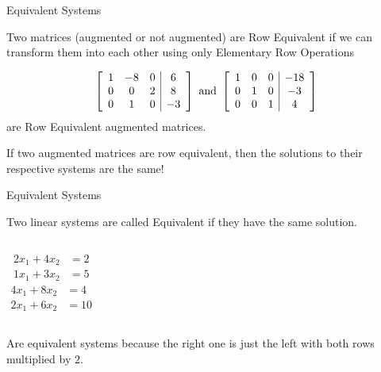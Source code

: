 \documentclass[xcoler=dvipsnames, aspectratio=169]{beamer}
\begin{document}
\begin{frame}{Equivalent Systems}
    \begin{defn}
        Two matrices (augmented or not augmented) are Row Equivalent if we can transform them into
        each other using only Elementary Row Operations
    \end{defn}
    \pause
    \begin{example}
        \[
            \aMat{ccc|c}{
                1 & -8 & 0 & 6\\
                0 &  0 & 2 & 8\\
                0 &  1 & 0 &-3
            }\text{ and }\aMat{ccc|c}{
                1 &  0 & 0 &-18\\
                0 &  1 & 0 &-3\\
                0 &  0 & 1 & 4
            }
        \]
        are Row Equivalent augmented matrices.
    \end{example}
    \pause
    \begin{rem}
        If two augmented matrices are row equivalent, then the solutions to their respective 
        systems are the same!
    \end{rem}
\end{frame}
\begin{frame}{Equivalent Systems}
    \begin{defn}
        Two linear systems are called Equivalent if they have the same solution.
    \end{defn}
    \pause
    \begin{example}
        \begin{columns}
            \begin{align*}
                2x_1 + 4x_2 &= 2\\
                1x_1 + 3x_2 &= 5
            \end{align*}
            \begin{align*}
                4x_1 + 8x_2 &= 4\\
                2x_1 + 6x_2 &= 10
            \end{align*}
        \end{columns}
        Are equivalent systems because the right one is just the left with both rows multiplied by $2$.
    \end{example}
\end{frame}
\end{document}
